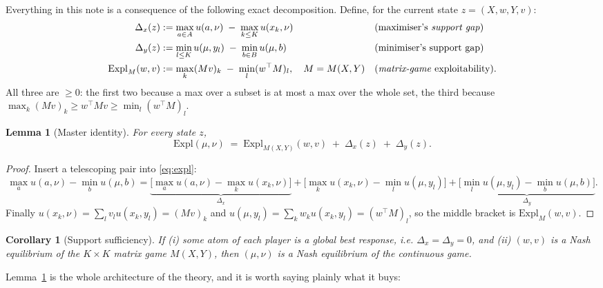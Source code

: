 \documentclass[11pt,a4paper]{article}
\theoremstyle{plain}
\newtheorem{lemma}[theorem]{Lemma}
\newtheorem{corollary}[theorem]{Corollary}
\theoremstyle{definition}
\theoremstyle{remark}
\newcommand{\Expl}{\mathrm{Expl}}
\begin{document}
Everything in this note is a consequence of the following exact decomposition.
Define, for the current state $z=(X,w,Y,v)$:
\begin{align}
\Delta_x(z) &:= \max_{a\in A} u(a,\nu) \;-\; \max_{k\le K} u(x_k,\nu)
&&\text{(maximiser's \emph{support gap})}\\
\Delta_y(z) &:= \min_{l\le K} u(\mu,y_l) \;-\; \min_{b\in B} u(\mu,b)
&&\text{(minimiser's support gap)}\\
\Expl_M(w,v) &:= \max_{k} (Mv)_k \;-\; \min_{l} (w^\top M)_l,
\quad M=M(X,Y) &&\text{(\emph{matrix-game} exploitability).}
\end{align}
All three are $\ge0$: the first two because a max over a subset is at most a max
over the whole set, the third because $\max_k(Mv)_k\ge w^\top Mv\ge\min_l(w^\top M)_l$.

\begin{lemma}[Master identity]\label{lem:identity}
For every state $z$,
\[
\boxed{\;\Expl(\mu,\nu)\;=\;\Expl_{M(X,Y)}(w,v)\;+\;\Delta_x(z)\;+\;\Delta_y(z).\;}
\]
\end{lemma}
\begin{proof}
Insert a telescoping pair into \eqref{eq:expl}:
\[
\max_a u(a,\nu)-\min_b u(\mu,b)
=\underbrace{\Big[\max_a u(a,\nu)-\max_k u(x_k,\nu)\Big]}_{\Delta_x}
+\Big[\max_k u(x_k,\nu)-\min_l u(\mu,y_l)\Big]
+\underbrace{\Big[\min_l u(\mu,y_l)-\min_b u(\mu,b)\Big]}_{\Delta_y}.
\]
Finally $u(x_k,\nu)=\sum_l v_l u(x_k,y_l)=(Mv)_k$ and
$u(\mu,y_l)=\sum_k w_k u(x_k,y_l)=(w^\top M)_l$, so the middle bracket is
$\Expl_M(w,v)$.
\end{proof}

\begin{corollary}[Support sufficiency]\label{cor:suff}
If (i) some atom of each player is a global best response, i.e.
$\Delta_x=\Delta_y=0$, and (ii) $(w,v)$ is a Nash equilibrium of the $K\times K$
matrix game $M(X,Y)$, then $(\mu,\nu)$ is a Nash equilibrium of the continuous
game.
\end{corollary}

\medskip
Lemma~\ref{lem:identity} is the whole architecture of the theory, and it is worth
saying plainly what it buys:
\end{document}
